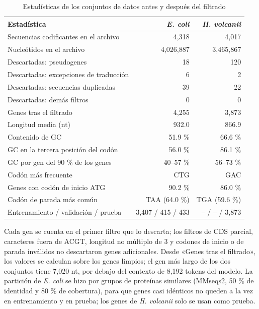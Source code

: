 \documentclass[sigconf,nonacm]{acmart}
\begin{document}
\begin{table}[t]
\caption{Estadísticas de los conjuntos de datos antes y después del filtrado}
\label{tab:datos}
\footnotesize
\setlength{\tabcolsep}{4pt}
\begin{tabular}{@{}lrr@{}}
\toprule
\textbf{Estadística} & \textbf{\emph{E. coli}} & \textbf{\emph{H. volcanii}} \\
\midrule
Secuencias codificantes en el archivo & 4,318 & 4,017 \\
Nucleótidos en el archivo & 4,026,887 & 3,465,867 \\
\midrule
Descartadas: pseudogenes & 18 & 120 \\
Descartadas: excepciones de traducción & 6 & 2 \\
Descartadas: secuencias duplicadas & 39 & 22 \\
Descartadas: demás filtros & 0 & 0 \\
\midrule
Genes tras el filtrado & 4,255 & 3,873 \\
Longitud media (nt) & 932.0 & 866.9 \\
Contenido de GC & 51.9 \% & 66.6 \% \\
GC en la tercera posición del codón & 56.0 \% & 86.1 \% \\
GC por gen del 90 \% de los genes & 40--57 \% & 56--73 \% \\
Codón más frecuente & CTG & GAC \\
Genes con codón de inicio ATG & 90.2 \% & 86.0 \% \\
Codón de parada más común & TAA (64.0 \%) & TGA (59.6 \%) \\
\midrule
Entrenamiento / validación / prueba & 3,407 / 415 / 433 & -- / -- / 3,873 \\
\bottomrule
\end{tabular}

\vspace{2pt}\parbox{\columnwidth}{\footnotesize Cada gen se cuenta en el primer filtro que lo descarta; los filtros de CDS parcial, caracteres fuera de ACGT, longitud no múltiplo de 3 y codones de inicio o de parada inválidos no descartaron genes adicionales. Desde «Genes tras el filtrado», los valores se calculan sobre los genes limpios; el gen más largo de los dos conjuntos tiene 7,020 nt, por debajo del contexto de 8,192 tokens del modelo. La partición de \emph{E. coli} se hizo por grupos de proteínas similares (MMseqs2, 50 \% de identidad y 80 \% de cobertura), para que genes casi idénticos no queden a la vez en entrenamiento y en prueba; los genes de \emph{H. volcanii} solo se usan como prueba.}
\end{table}
\end{document}
